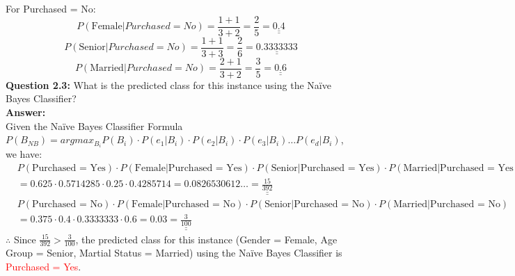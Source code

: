 \documentclass{book}
\begin{document}
For Purchased = No:
\[
    P(\text{Female}|Purchased = No) = \frac{1 + 1}{3 + 2} = \frac{2}{5} = \underline{\underline{0.4}}
\]
\[
    P(\text{Senior}|Purchased = No) = \frac{1 + 1}{3 + 3} = \frac{2}{6} = \underline{\underline{0.3333333}}
\]
\[
    P(\text{Married}|Purchased = No) = \frac{2 + 1}{3 + 2} = \frac{3}{5} = \underline{\underline{0.6}}
\]
\textbf{Question 2.3:} What is the predicted class for this instance using the Naïve Bayes Classifier?\\
\textbf{Answer:}\\
Given the Naïve Bayes Classifier Formula \(P(B_{NB}) = argmax_{B_i} P(B_i) \cdot P(e_1|B_i) \cdot P(e_2|B_i) \cdot P(e_3|B_i) \ldots P(e_d|B_i)\), we have:
\begin{align*}
    & P(\text{Purchased = Yes}) \cdot P(\text{Female}|\text{Purchased = Yes}) \cdot P(\text{Senior}|\text{Purchased = Yes}) \cdot P(\text{Married}|\text{Purchased = Yes}) \\
    & = 0.625 \cdot 0.5714285 \cdot 0.25 \cdot 0.4285714 = 0.0826530612\ldots = \underline{\underline{\frac{15}{392}}}
\end{align*}
\begin{align*}
    & P(\text{Purchased = No}) \cdot P(\text{Female}|\text{Purchased = No}) \cdot P(\text{Senior}|\text{Purchased = No}) \cdot P(\text{Married}|\text{Purchased = No}) \\
    & = 0.375 \cdot 0.4 \cdot 0.3333333 \cdot 0.6 = 0.03 = \underline{\underline{\frac{3}{100}}}
\end{align*}
$\therefore$ Since \(\frac{15}{392} > \frac{3}{100}\), the predicted class for this instance (Gender = Female, Age Group = Senior, Martial Status = Married) using the Naïve Bayes Classifier is \textcolor{red}{Purchased = Yes}.\\
\end{document}
